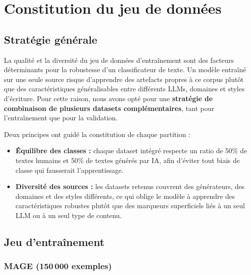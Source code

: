 ﻿\documentclass[12pt, a4paper]{report}
\begin{document}

\chapter{Constitution du jeu de données}

\section{Stratégie générale}

La qualité et la diversité du jeu de données d'entraînement sont des facteurs
déterminants pour la robustesse d'un classificateur de texte. Un modèle entraîné
sur une seule source risque d'apprendre des artefacts propres à ce corpus plutôt
que des caractéristiques généralisables entre différents LLMs, domaines et styles
d'écriture. Pour cette raison, nous avons opté pour une \textbf{stratégie de
combinaison de plusieurs datasets complémentaires}, tant pour l'entraînement que
pour la validation.

Deux principes ont guidé la constitution de chaque partition :
\begin{itemize}
  \item \textbf{Équilibre des classes :} chaque dataset intégré respecte un ratio
        de 50\% de textes humains et 50\% de textes générés par IA, afin d'éviter
        tout biais de classe qui fausserait l'apprentissage.
  \item \textbf{Diversité des sources :} les datasets retenus couvrent des
        générateurs, des domaines et des styles différents, ce qui oblige le modèle
        à apprendre des caractéristiques robustes plutôt que des marqueurs
        superficiels liés à un seul LLM ou à un seul type de contenu.
\end{itemize}

\section{Jeu d'entraînement}

\subsection{MAGE (150\,000 exemples)}
\end{document}
